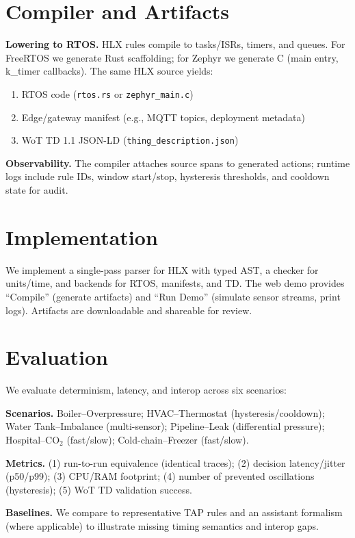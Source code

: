 \documentclass[journal]{IEEEtran}
\begin{document}
\section{Compiler and Artifacts}
\textbf{Lowering to RTOS.} HLX rules compile to tasks/ISRs, timers, and queues. For FreeRTOS we generate Rust scaffolding; for Zephyr we generate C (main entry, k\_timer callbacks). The same HLX source yields:
\begin{enumerate}
  \item RTOS code (\texttt{rtos.rs} or \texttt{zephyr\_main.c})
  \item Edge/gateway manifest (e.g., MQTT topics, deployment metadata)
  \item WoT TD 1.1 JSON-LD (\texttt{thing\_description.json})
\end{enumerate}

\noindent \textbf{Observability.} The compiler attaches source spans to generated actions; runtime logs include rule IDs, window start/stop, hysteresis thresholds, and cooldown state for audit.

\section{Implementation}
We implement a single-pass parser for HLX with typed AST, a checker for units/time, and backends for RTOS, manifests, and TD. The web demo provides “Compile” (generate artifacts) and “Run Demo” (simulate sensor streams, print logs). Artifacts are downloadable and shareable for review.

\section{Evaluation}
We evaluate determinism, latency, and interop across six scenarios:

\noindent\textbf{Scenarios.} Boiler–Overpressure; HVAC–Thermostat (hysteresis/cooldown); Water Tank–Imbalance (multi-sensor); Pipeline–Leak (differential pressure); Hospital–CO$_2$ (fast/slow); Cold-chain–Freezer (fast/slow).

\noindent\textbf{Metrics.} (1) run-to-run equivalence (identical traces); (2) decision latency/jitter (p50/p99); (3) CPU/RAM footprint; (4) number of prevented oscillations (hysteresis); (5) WoT TD validation success.

\noindent\textbf{Baselines.} We compare to representative TAP rules and an assistant formalism (where applicable) to illustrate missing timing semantics and interop gaps.
\end{document}
